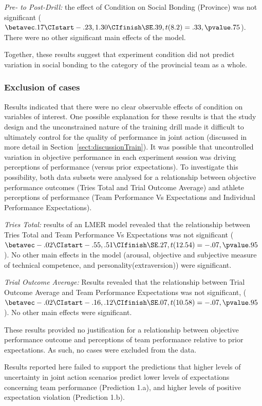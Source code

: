 \begin{CJK}{UTF8}{gbsn}
\textit{Pre- to Post-Drill:} the effect of Condition on Social Bonding (Province) was not significant ($\betavec .17 \CIstart -.23, 1.30 \CIfinish \SE .39, t(8.2)= .33, \pvalue .75$). There were no other significant main effects of the model.

Together, these results suggest that experiment condition did not predict variation in social bonding to the category of the provincial team as a whole.



\subsubsection{Exclusion of cases}
Results indicated that there were no clear observable effects of condition on variables of interest.  One possible explanation for these results is that the study design and the unconstrained nature of the training drill made it difficult to ultimately control for the quality of performance in joint action (discussed in more detail in Section~\ref{sect:discussionTrain}).  It was possible that uncontrolled variation in objective performance in each experiment session was driving perceptions of performance (versus prior expectations).  To investigate this possibility, both data subsets were analysed for a relationship between objective performance outcomes (Tries Total and Trial Outcome Average) and athlete perceptions of performance (Team Performance Vs Expectations and Individual Performance Expectations).

\textit{Tries Total:} results of an LMER model revealed that the relationship between Tries Total and Team Performance Vs Expectations was not significant ($\betavec -.02 \CIstart -.55, .51 \CIfinish \SE .27, t(12.54)= -.07, \pvalue .95$).  No other main effects in the model (arousal, objective and subjective measure of technical competence, and personality(extraversion)) were significant.

\textit{Trial Outcome Average:} Results revealed that the relationship between Trial Outcome Average and Team Performance Expectations was not significant, ($\betavec -.02 \CIstart -.16, .12 \CIfinish \SE .07, t(10.58)= -.07, \pvalue .95$). No other main effects were significant.

These results provided no justification for a relationship between objective performance outcome and perceptions of team performance relative to prior expectations.  As such, no cases were excluded from the data.

Results reported here failed to support the predictions that higher levels of uncertainty in joint action scenarios predict lower levels of expectations concerning team performance (Prediction 1.a), and higher levels of positive expectation violation (Prediction 1.b).


\end{CJK}
